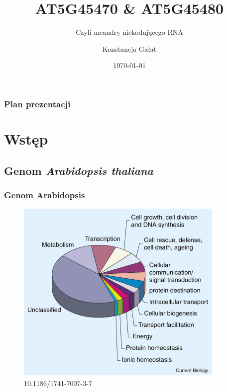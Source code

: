 \documentclass{beamer}
\title{AT5G45470 \& AT5G45480}
\subtitle{Czyli meandry niekodującego RNA}
\author{Konstancja Gałat}
\institute{BtMol II rok}
\date{\today}
\begin{document}
\begin{frame}
    \titlepage
\end{frame}

\begin{frame}
    \frametitle{Plan prezentacji}
    \tableofcontents
\end{frame}

\section{Wstęp}
\subsection{Genom \textit{Arabidopsis thaliana}}

\begin{frame}
    \frametitle{Genom Arabidopsis}
    \begin{figure}
        \centering
        \includegraphics[scale=0.8]{functions.jpg}\\
        \scriptsize{10.1186/1741-7007-3-7}
    \end{figure}
\end{frame}
\end{document}
